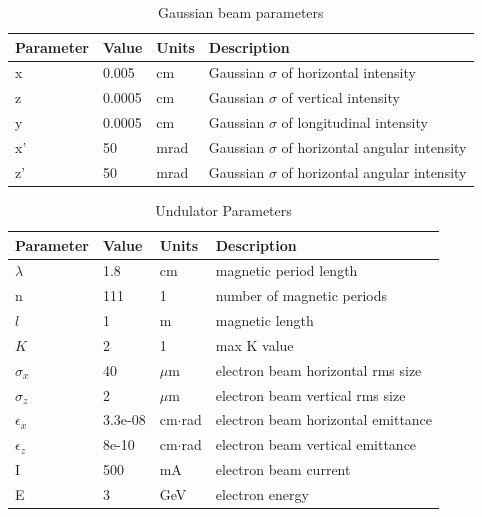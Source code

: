 \documentclass[preprint]{iucr}              %
\begin{document}
\begin{table}\label{gaussian}
\caption{Gaussian beam parameters}
\begin{tabular}{@{}llll@{}}
\toprule
Parameter       & Value         & Units     & Description                                          \\
\hline
x               & 0.005         & cm        & Gaussian $\sigma$ of horizontal intensity            \\
z               & 0.0005        & cm        & Gaussian $\sigma$ of vertical intensity              \\ 
y               & 0.0005        & cm        & Gaussian $\sigma$ of longitudinal intensity          \\
x'              & 50            & mrad      & Gaussian $\sigma$ of horizontal angular intensity    \\
z'              & 50            & mrad      & Gaussian $\sigma$ of horizontal angular intensity    \\

\end{tabular}
\end{table}

\begin{table}\label{ivubiomax}
\caption{Undulator Parameters}
\begin{tabular}{@{}llll@{}}
\toprule
Parameter       & Value         & Units     & Description                           \\
\hline
$\lambda$       & 1.8           & cm        & magnetic period length                \\
n               & 111           & 1         & number of magnetic periods            \\ 
$l$             & 1             & m         & magnetic length                       \\
$K$             & 2             & 1         & max K value                           \\
$\sigma_x$      & 40            & $\mu$m    & electron beam horizontal rms size     \\
$\sigma_z$      & 2             & $\mu$m    & electron beam vertical rms size       \\
$\epsilon_x$    & 3.3e-08       & cm$\cdot$rad    & electron beam horizontal emittance    \\
$\epsilon_z$    & 8e-10         & cm$\cdot$rad    & electron beam vertical emittance      \\
I               & 500           & mA        & electron beam current                 \\
E               & 3             & GeV       & electron energy                       \\
\end{tabular}
\end{table}
\end{document}

